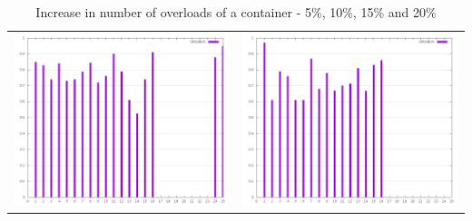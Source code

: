 \documentclass[a4paper, 11pt]{article}
\begin{document}
\begin{table}[!htb]
\begin{tabular}{cc}
  \includegraphics[scale=0.2]{cp1479681211168_15} & \includegraphics[scale=0.2]{cp1479681211168_20} \\
  \end{tabular}
  \caption{Increase in number of overloads of a container - 5\%, 10\%, 15\% and 20\%}
\end{table}

\newpage


\newpage
\end{document}
